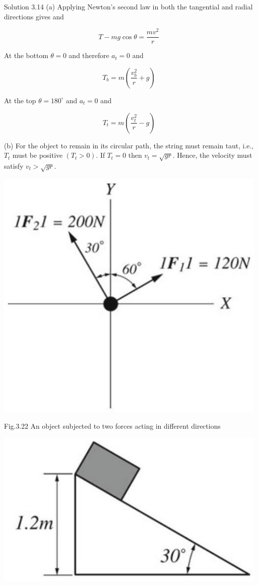 \documentclass[10pt]{article}
\begin{document}
Solution 3.14 (a) Applying Newton's second law in both the tangential and radial directions gives and

$$
T-m g \cos \theta=\frac{m v^{2}}{r}
$$

At the bottom $\theta=0$ and therefore $a_{t}=0$ and

$$
T_{b}=m\left(\frac{v_{b}^{2}}{r}+g\right)
$$

At the top $\theta=180^{\circ}$ and $a_{t}=0$ and

$$
T_{t}=m\left(\frac{v_{t}^{2}}{r}-g\right)
$$

(b) For the object to remain in its circular path, the string must remain taut, i.e., $T_{t}$ must be positive $\left(T_{t}>0\right)$. If $T_{t}=0$ then $v_{t}=\sqrt{g r}$. Hence, the velocity must satisfy $v_{t}>\sqrt{g r}$.

\begin{center}
\includegraphics[max width=\textwidth]{2024_09_13_db1f357d2aad0a03eb2eg-059(2)}
\end{center}

Fig.3.22 An object subjected to two forces acting in different directions

\begin{center}
\includegraphics[max width=\textwidth]{2024_09_13_db1f357d2aad0a03eb2eg-059}
\end{center}
\end{document}
